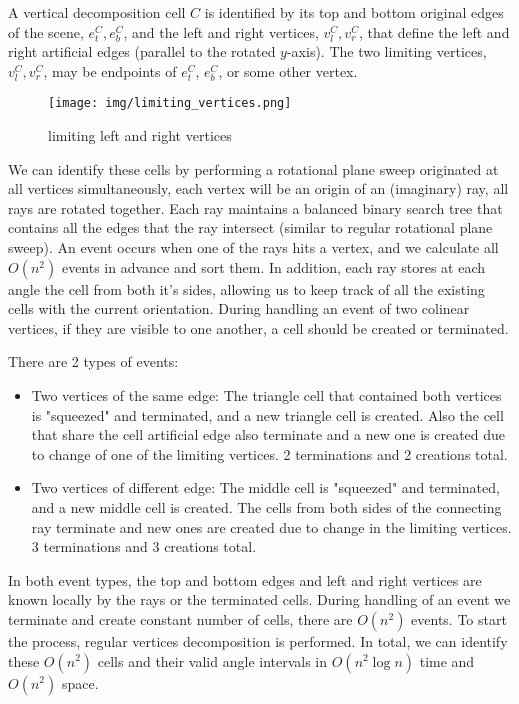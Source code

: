 \documentclass[a4paper,12pt]{extarticle}
\begin{document}
A vertical decomposition cell $C$ is identified by its top and bottom original edges of the scene, $e^{C}_{t},e^{C}_{b}$, and the left and right vertices, $v^{C}_{l},v^{C}_{r}$, that define the left and right artificial edges (parallel to the rotated $y$-axis). The two limiting vertices, $v^{C}_{l},v^{C}_{r}$, may be endpoints of $e^{C}_{t}$, $e^{C}_{b}$, or some other vertex.

\begin{figure}[h]
    \centering
    \texttt{[image: img/limiting\_vertices.png]}
    \caption{limiting left and right vertices}
\end{figure}

We can identify these cells by performing a rotational plane sweep originated at all vertices simultaneously, each vertex will be an origin of an (imaginary) ray, all rays are rotated together. Each ray maintains a balanced binary search tree that contains all the edges that the ray intersect (similar to regular rotational plane sweep). An event occurs when one of the rays hits a vertex, and we calculate all $O(n^{2})$ events in advance and sort them. In addition, each ray stores at each angle the cell from both it's sides, allowing us to keep track of all the existing cells with the current orientation. During handling an event of two colinear vertices, if they are visible to one another, a cell should be created or terminated.

There are 2 types of events:
\begin{itemize}
  \item Two vertices of the same edge: The triangle cell that contained both vertices is "squeezed" and terminated, and a new triangle cell is created. Also the cell that share the cell artificial edge also terminate and a new one is created due to change of one of the limiting vertices. 2 terminations and 2 creations total.
  \item Two vertices of different edge: The middle cell is "squeezed" and terminated, and a new middle cell is created. The cells from both sides of the connecting ray terminate and new ones are created due to change in the limiting vertices. 3 terminations and 3 creations total.
\end{itemize}
In both event types, the top and bottom edges and left and right vertices are known locally by the rays or the terminated cells. During handling of an event we terminate and create constant number of cells, there are $O(n^{2})$ events. To start the process, regular vertices decomposition is performed.
In total, we can identify these $O(n^{2})$ cells and their valid angle intervals in $O(n^{2}\log n)$ time and $O(n^{2})$ space.
\end{document}
